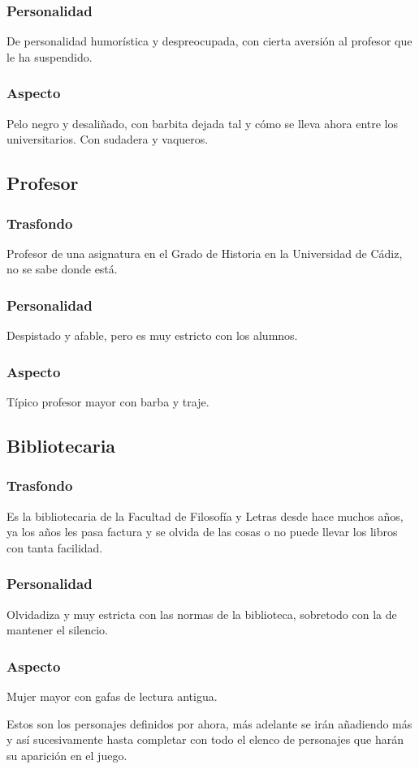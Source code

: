             \subsubsection{Personalidad}
            De personalidad humorística y despreocupada, con cierta aversión al profesor que le ha suspendido.
            \subsubsection{Aspecto}
            Pelo negro y desaliñado, con barbita dejada tal y cómo se lleva ahora entre los universitarios. Con sudadera y vaqueros.
                
        \subsection{Profesor}
            \subsubsection{Trasfondo}
            Profesor de una asignatura en el Grado de Historia en la Universidad de Cádiz, no se sabe donde está.
            \subsubsection{Personalidad}
            Despistado y afable, pero es muy estricto con los alumnos.
            \subsubsection{Aspecto}
            Típico profesor mayor con barba y traje.
            
        \subsection{Bibliotecaria}
            \subsubsection{Trasfondo}
            Es la bibliotecaria de la Facultad de Filosofía y Letras desde hace muchos años, ya los años les pasa factura y se olvida de las cosas o no puede llevar los libros con tanta facilidad.
            \subsubsection{Personalidad}
            Olvidadiza y muy estricta con las normas de la biblioteca, sobretodo con la de mantener el silencio.
            \subsubsection{Aspecto}
            Mujer mayor con gafas de lectura antigua.
    
    Estos son los personajes definidos por ahora, más adelante se irán añadiendo más y así sucesivamente hasta completar con todo el elenco de personajes que harán su aparición en el juego.

